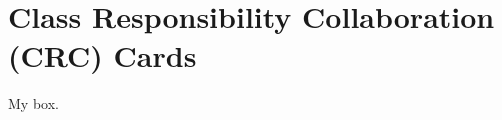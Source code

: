\section{Class Responsibility Collaboration (CRC) Cards}
\label{sec:crc_cards}

\begin{tcolorbox}[colback=red!5!white,colframe=red!75!black]
    My box.
\end{tcolorbox}
